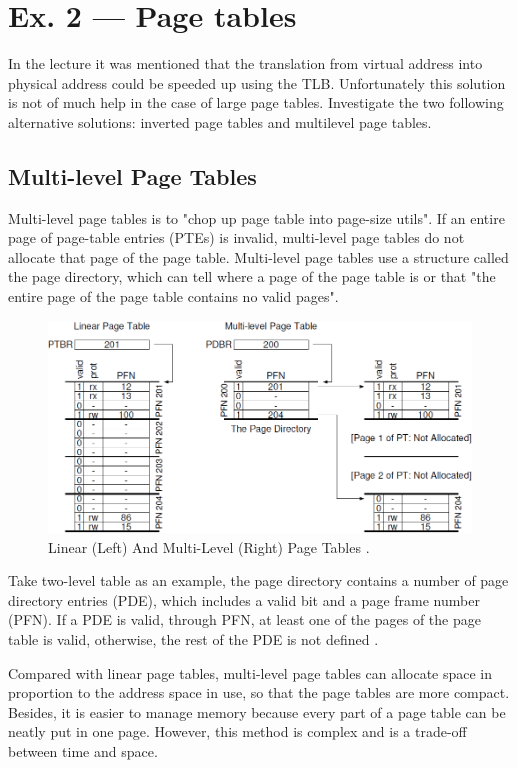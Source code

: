 \documentclass[a4paper]{article}
\begin{document}
\section*{Ex. 2 — Page tables}
In the lecture it was mentioned that the translation from virtual address into physical address could be speeded up using the TLB. Unfortunately this solution is not of much help in the case of large page tables. Investigate the two following alternative solutions: inverted page tables and multilevel page tables.
\setcounter{section}{2}
\subsection{Multi-level Page Tables}
Multi-level page tables is to "chop up page table into page-size utils". If an entire page of page-table entries (PTEs) is invalid, multi-level page tables do not allocate that page of the page table. Multi-level page tables use a structure called the page directory, which can tell where a page of the page table is or that "the entire page of the page table contains no valid pages".
\begin{figure}[H]
    \centering
    \includegraphics[width=1\textwidth]{2.png}
    \caption{Linear (Left) And Multi-Level (Right) Page Tables \cite{ostep}.}
\end{figure}
Take two-level table as an example, the page directory contains a number of page directory entries (PDE), which includes a valid bit and a page frame number (PFN). If a PDE is valid, through PFN, at least one of the pages of the page table is valid, otherwise, the rest of the PDE is not defined \cite{ostep}.

Compared with linear page tables, multi-level page tables can allocate space in proportion to the address space in use, so that the page tables are more compact. Besides, it is easier to manage memory because every part of a page table can be neatly put in one page. However, this method is complex and is a trade-off between time and space.
\end{document}
